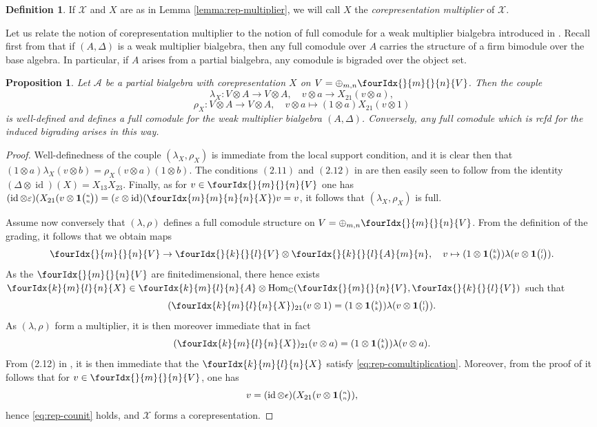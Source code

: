 \documentclass[11pt]{article}
\DeclareMathOperator{\id}{id}
\DeclareMathOperator{\Hom}{Hom}
\newcommand{\C}{\mathbb{C}}
\newcommand{\Grt}[3]{#1{\tiny {\begin{pmatrix} #2\\#3\end{pmatrix}}}}
\newcommand{\UnitC}[2]{\Grt{\mathbf{1}}{#1}{#2}}
\newcommand{\Gr}[5]{\fourIdx{#2}{#4}{#3}{#5}{#1}}%
\newcommand{\Gru}[3]{\Gr{#1}{}{}{#2}{#3}}
\newtheorem{Prop}[Theorem]{Proposition}
\theoremstyle{definition}
\newtheorem{Def}[Theorem]{Definition}
\numberwithin{equation}{section}
\begin{document}
\begin{Def} If $\mathscr{X}$ and $X$ are as in Lemma \ref{lemma:rep-multiplier}, we will call $X$ the \emph{corepresentation multiplier} of $\mathscr{X}$. 
\end{Def}

Let us relate the notion of corepresentation multiplier to the notion of full comodule for a weak multiplier bialgebra introduced in \cite[Definition 2.2 and Definition 4.2]{Boh2}. Recall first from \cite[Theorem 4.5]{Boh2} that if $(A,\Delta)$ is a weak multiplier bialgebra, then any full comodule over $A$ carries the structure of a firm bimodule over the base algebra. In particular, if $A$ arises from a partial bialgebra, any comodule is bigraded over the object set. 

\begin{Prop} Let $\mathscr{A}$ be a partial bialgebra with corepresentation $X$ on $V = \oplus_{m,n} \Gru{V}{m}{n}$. Then the couple \[\lambda_X: V\otimes A \rightarrow V\otimes A,\quad v\otimes a \rightarrow X_{21}(v\otimes a),\] 
\[\rho_X: V\otimes A\rightarrow V\otimes A,\quad v\otimes a \mapsto (1\otimes a)X_{21}(v\otimes 1)\] is well-defined and defines a full comodule for the weak multiplier bialgebra $(A,\Delta)$. Conversely, any full comodule which is rcfd for the induced bigrading arises in this way.
\end{Prop} 

\begin{proof} Well-definedness of the couple $(\lambda_X,\rho_X)$ is immediate from the local support condition, and it is clear then that $(1\otimes a)\lambda_X(v\otimes b) = \rho_X(v\otimes a)(1\otimes b)$.  The conditions $(2.11)$ and $(2.12)$ in \cite[Definition 2.12]{Boh2} are then easily seen to follow from the identity $(\Delta\otimes \id)(X) = X_{13}X_{23}$. Finally, as for $v\in \Gru{V}{m}{n}$ one has $(\id\otimes \varepsilon)(X_{21}(v\otimes \UnitC{n}{n}) = (\varepsilon\otimes \id)(\Gr{X}{m}{n}{m}{n}) v  = v$, it follows that $(\lambda_X,\rho_X)$ is full.

Assume now conversely that $(\lambda,\rho)$ defines a full comodule structure on $V = \oplus_{m,n} \Gru{V}{m}{n}$. From the definition of the grading, it follows that we obtain maps \[\Gru{V}{m}{n}\rightarrow \Gru{V}{k}{l}\otimes \Gru{A}{k}{l}{m}{n},\quad v \mapsto (1\otimes \UnitC{k}{k})\lambda(v\otimes \UnitC{l}{l}).\] As the $\Gru{V}{m}{n}$ are finitedimensional, there hence exists $\Gr{X}{k}{l}{m}{n} \in \Gr{A}{k}{l}{m}{n}\otimes \Hom_{\C}(\Gru{V}{m}{n},\Gru{V}{k}{l})$ such that  
\[(\Gr{X}{k}{l}{m}{n})_{21}(v\otimes 1)=(1\otimes \UnitC{k}{k})\lambda(v\otimes \UnitC{l}{l}).\] As $(\lambda,\rho)$ form a multiplier, it is then moreover immediate that in fact \[(\Gr{X}{k}{l}{m}{n})_{21}(v\otimes a) = (1\otimes \UnitC{k}{k})\lambda(v\otimes a).\] From (2.12) in \cite[Definition 2.12]{Boh2}, it is then immediate that the $\Gr{X}{k}{l}{m}{n}$ satisfy \eqref{eq:rep-comultiplication}. Moreover, from the proof of \cite[Theorem 4.5]{Boh2} it follows that for $v\in \Gru{V}{m}{n}$, one has \[v = (\id\otimes \epsilon)(X_{21}(v\otimes \UnitC{n}{n}),\] hence \eqref{eq:rep-counit} holds, and $\mathscr{X}$ forms a corepresentation. %
\end{proof}
\end{document}
